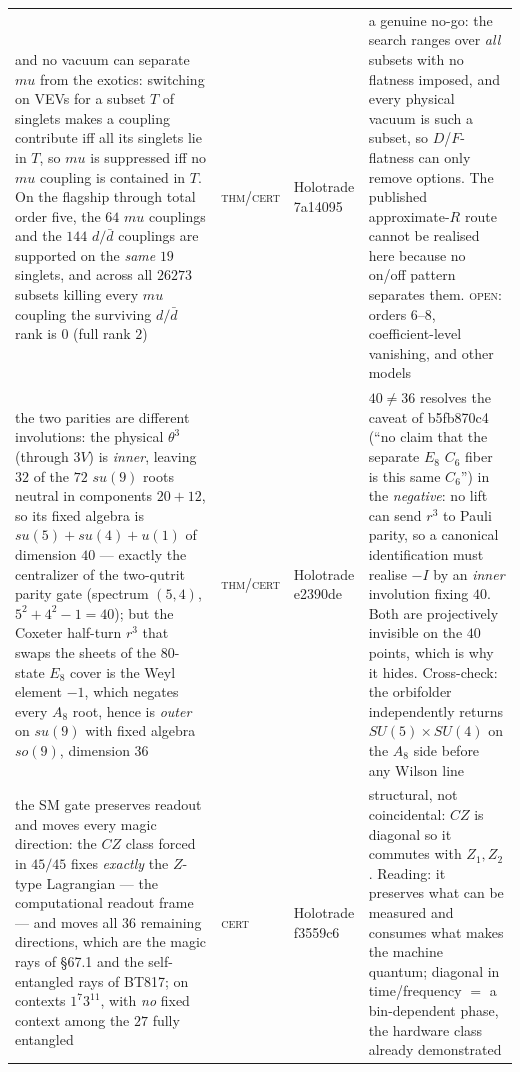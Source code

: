 \documentclass[12pt,a4paper]{article}
\def\mathfrak#1{#1}%
\def\textbf#1{#1}%
\def\texttt#1{#1}%
\def\mu{mu}%
\theoremstyle{definition}
\begin{document}
\begin{center}
\begin{tabular}{@{}p{}llp{}@{}}
\textbf{and no vacuum can separate $\mu$ from the exotics}: switching on VEVs for a subset $T$ of singlets makes a coupling contribute iff all its singlets lie in $T$, so $\mu$ is suppressed iff no $\mu$ coupling is contained in $T$. On the flagship through total order five, the $64$ $\mu$ couplings and the $144$ $d/\bar d$ couplings are supported on the \emph{same} $19$ singlets, and across all $26273$ subsets killing every $\mu$ coupling the surviving $d/\bar d$ rank is $0$ (full rank $2$) & \textsc{thm}/\textsc{cert} & Holotrade \texttt{7a14095} & a genuine no-go: the search ranges over \emph{all} subsets with no flatness imposed, and every physical vacuum is such a subset, so $D$/$F$-flatness can only remove options. The published approximate-$R$ route cannot be realised here because no on/off pattern separates them. \textsc{open}: orders $6$--$8$, coefficient-level vanishing, and other models \\
\textbf{the two parities are different involutions}: the physical $\theta^3$ (through $3V$) is \emph{inner}, leaving $32$ of the $72$ $\mathfrak{su}(9)$ roots neutral in components $20{+}12$, so its fixed algebra is $\mathfrak{su}(5){+}\mathfrak{su}(4){+}\mathfrak{u}(1)$ of dimension $40$ --- exactly the centralizer of the two-qutrit parity gate (spectrum $(5,4)$, $5^2{+}4^2{-}1=40$); but the Coxeter half-turn $r^3$ that swaps the sheets of the $80$-state $E_8$ cover is the Weyl element $-1$, which negates every $A_8$ root, hence is \emph{outer} on $\mathfrak{su}(9)$ with fixed algebra $\mathfrak{so}(9)$, dimension $36$ & \textsc{thm}/\textsc{cert} & Holotrade \texttt{e2390de} & $40\neq 36$ resolves the caveat of \texttt{b5fb870c4} (``no claim that the separate $E_8$ $C_6$ fiber is this same $C_6$'') in the \emph{negative}: no lift can send $r^3$ to Pauli parity, so a canonical identification must realise $-I$ by an \emph{inner} involution fixing $40$. Both are projectively invisible on the $40$ points, which is why it hides. Cross-check: the orbifolder independently returns $SU(5){\times}SU(4)$ on the $A_8$ side before any Wilson line \\
\textbf{the SM gate preserves readout and moves every magic direction}: the $CZ$ class forced in $45/45$ fixes \emph{exactly} the $Z$-type Lagrangian --- the computational readout frame --- and moves all $36$ remaining directions, which are the magic rays of \S67.1 and the self-entangled rays of BT817; on contexts $1^7 3^{11}$, with \emph{no} fixed context among the $27$ fully entangled & \textsc{cert} & Holotrade \texttt{f3559c6} & structural, not coincidental: $CZ$ is diagonal so it commutes with $Z_1,Z_2$. Reading: it preserves what can be measured and consumes what makes the machine quantum; diagonal in time/frequency $=$ a bin-dependent phase, the hardware class already demonstrated \\

\end{tabular}
\end{center}
\end{document}
